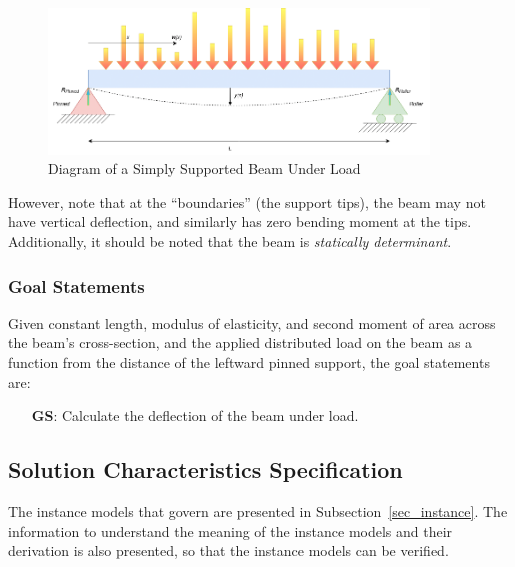 \documentclass[12pt]{article}
\newcounter{goalnum} %
\begin{document}
\begin{figure}[H]
    \begin{center}
        \includegraphics[width=0.9\textwidth]{temp/beam_bending_diagram_annotated.drawio.png}
        \caption{\label{beam_bending_diagram_annotated} Diagram of a Simply Supported Beam Under Load}
    \end{center}
\end{figure}

\noindent{}However, note that at the ``boundaries'' (the support tips), the beam
may not have vertical deflection, and similarly has zero bending moment at the
tips. Additionally, it should be noted that the beam is \textit{statically
    determinant}.

\subsubsection{Goal Statements}
\label{sssec_goals}

\noindent{}Given constant length, modulus of elasticity, and second moment of
area across the beam's cross-section, and the applied distributed load on the
beam as a function from the distance of the leftward pinned support, the goal
statements are:

\begin{itemize}

    \item[\refstepcounter{goalnum}\textbf{GS\thegoalnum{}}\label{deflection}:]
        Calculate the deflection of the beam under load.

\end{itemize}

\subsection{Solution Characteristics Specification}

The instance models that govern \progname{} are presented in
Subsection~\ref{sec_instance}.  The information to understand the meaning of the
instance models and their derivation is also presented, so that the instance
models can be verified.
\end{document}
